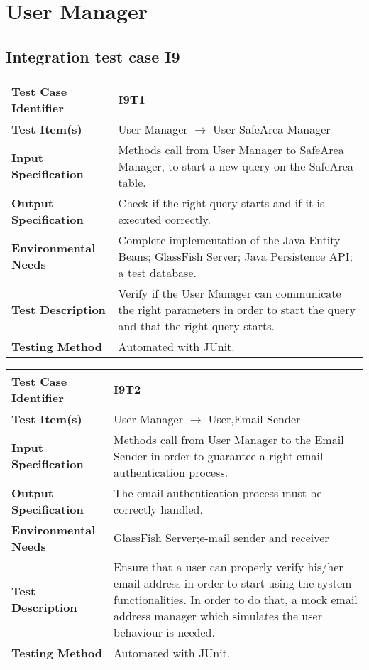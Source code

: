 \section{User Manager}
\subsection{Integration test case I9}

\begin{tabular}{l p{}}
    \hline
    \textbf{Test Case Identifier} & I9T1\\
    \hline
    \textbf{Test Item(s)} & User Manager $\rightarrow$ User SafeArea Manager\\
    \hline
    \textbf{Input Specification} & Methods call from User Manager to SafeArea Manager, to start a new query on the SafeArea table.\\
    \hline
    \textbf{Output Specification} & Check if the right query starts and if it is executed correctly.\\
    \hline
    \textbf{Environmental Needs} & Complete implementation of the Java Entity Beans; GlassFish Server; Java Persistence API; a test database.\\
    \hline
    \textbf{Test Description} & Verify if the User Manager can communicate the right parameters in order to start the query and that the right query starts.\\
    \hline
    \textbf{Testing Method} & Automated with JUnit.\\
    \hline
\end{tabular}


\vspace{2em}

\noindent\begin{tabular}{l p{}}
    \hline
    \textbf{Test Case Identifier} & I9T2\\
    \hline
    \textbf{Test Item(s)} & User Manager $\rightarrow$ User,Email Sender \\
    \hline
    \textbf{Input Specification} & Methods call from User Manager to the Email Sender in order to guarantee a right email authentication process.\\
    \hline
    \textbf{Output Specification} & The email authentication process must be correctly handled.\\
    \hline
    \textbf{Environmental Needs} & GlassFish Server;e-mail sender and receiver\\
    \hline
    \textbf{Test Description} & Ensure that a user can properly verify his/her email address in order to start using the system functionalities. In order to do that, a mock email address manager which simulates the user behaviour is needed.\\
    \hline
    \textbf{Testing Method} & Automated with JUnit.\\
    \hline
\end{tabular}